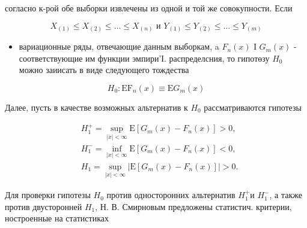 \documentclass[10pt]{article}
\begin{document}
согласно к-рой обе выборки извлечены из одной и той же совокупности. Если



\[

X_{(1)} \leqslant X_{(2)} \leqslant \ldots \leqslant X_{(n)} \text { и } Y_{(1)} \leqslant Y_{(2)} \leqslant \ldots \leqslant Y_{(m)}

\]



\begin{itemize}

  \item вариационные ряды, отвечающие данным выборкам, a $F_{n}(x)$ І $G_{m}(x)$ - соответствующие им функции эмпири'І. распределсния, то гипотөзу $H_{0}$ можно заиисать в виде следующего тождества

\end{itemize}



\[

H_{0}: \mathrm{EF}_{n}(x) \equiv \mathrm{E} G_{m}(x)

\]



Далее, пусть в качестве возможных альтернатив к $H_{0}$ рассматриваются гипотезы



\[

\begin{aligned}

& H_{1}^{+}=\sup _{|x|<\infty} \mathrm{E}\left[G_{m}(x)-F_{n}(x)\right]>0, \\

& H_{1}^{-}=\inf _{|x|<\infty} \mathrm{E}\left[G_{m}(x)-F_{n}(x)\right]<0, \\

& H_{1}=\sup _{|x|<\infty}\left|\mathrm{E}\left[G_{m}(x)-F_{n}(x)\right]\right|>0 .

\end{aligned}

\]



Для проверки гипотезы $H_{0}$ против односторонних альтернатив $H_{1}^{+}$и $H_{1}^{-}$, а также против двусторонней $H_{1}$, Н. В. Смирновым предложены статистич. критерии, ностроенные на статистиках
\end{document}
